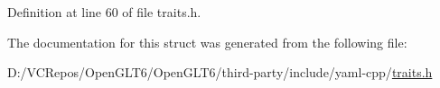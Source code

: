 Definition at line 60 of file traits.\+h.



The documentation for this struct was generated from the following file\+:\begin{DoxyCompactItemize}
\item 
D\+:/\+V\+C\+Repos/\+Open\+G\+L\+T6/\+Open\+G\+L\+T6/third-\/party/include/yaml-\/cpp/\mbox{\hyperlink{traits_8h}{traits.\+h}}\end{DoxyCompactItemize}
